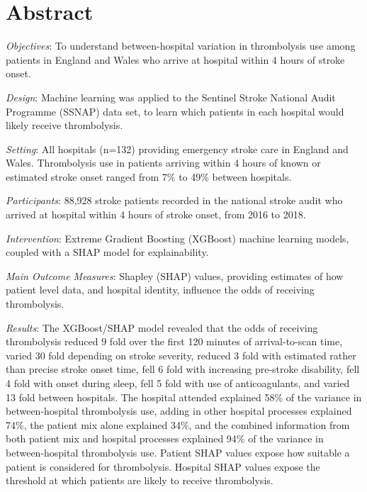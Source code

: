 \section*{Abstract}

\emph{Objectives}: To understand between-hospital variation in thrombolysis use among patients in England and Wales who arrive at hospital within 4 hours of stroke onset.

\emph{Design}: Machine learning was applied to the Sentinel Stroke National Audit Programme (SSNAP)  data set, to learn which patients in each hospital would likely receive thrombolysis.

\emph{Setting}: All hospitals (n=132) providing emergency stroke care in England and Wales. Thrombolysis use in patients arriving within 4 hours of known or estimated stroke onset ranged from 7\% to 49\% between hospitals.

\emph{Participants}: 88,928 stroke patients recorded in the national stroke audit who arrived at hospital within 4 hours of stroke onset, from 2016 to 2018.

\emph{Intervention}: Extreme Gradient Boosting (XGBoost) machine learning models, coupled with a SHAP model for explainability.

\emph{Main Outcome Measures}: Shapley (SHAP) values, providing estimates of how patient level data, and hospital identity, influence the odds of receiving thrombolysis.

\emph{Results}: The XGBoost/SHAP model revealed that the odds of receiving thrombolysis reduced 9 fold over the first 120 minutes of arrival-to-scan time, varied 30 fold depending on stroke severity, reduced 3 fold with estimated rather than precise stroke onset time, fell 6 fold with increasing pre-stroke disability, fell 4 fold with onset during sleep, fell 5 fold with use of anticoagulants, and varied 13 fold between hospitals. The hospital attended explained 58\% of the variance in between-hospital thrombolysis use, adding in other hospital processes explained 74\%, the patient mix alone explained 34\%, and the combined information from both patient mix and hospital processes explained 94\% of the variance in between-hospital thrombolysis use. %
Patient SHAP values expose how suitable a patient is considered for thrombolysis. Hospital SHAP values expose the threshold at which patients are likely to receive thrombolysis.



